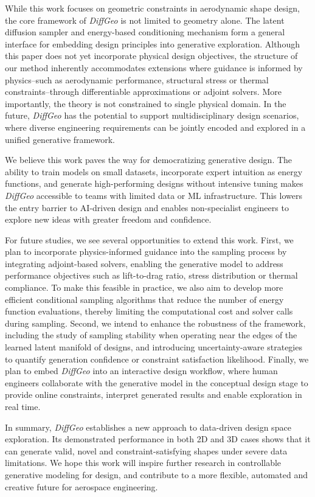 While this work focuses on geometric constraints in aerodynamic shape design, the core framework of \textit{DiffGeo} is not limited to geometry alone. The latent diffusion sampler and energy-based conditioning mechanism form a general interface for embedding design principles into generative exploration. Although this paper does not yet incorporate physical design objectives, the structure of our method inherently accommodates extensions where guidance is informed by physics--such as aerodynamic performance, structural stress or thermal constraints--through differentiable approximations or adjoint solvers. More importantly, the theory is not constrained to single physical domain. In the future, \textit{DiffGeo} has the potential to support multidisciplinary design scenarios, where diverse engineering requirements can be jointly encoded and explored in a unified generative framework.

We believe this work paves the way for democratizing generative design. The ability to train models on small datasets, incorporate expert intuition as energy functions, and generate high-performing designs without intensive tuning makes \textit{DiffGeo} accessible to teams with limited data or ML infrastructure. This lowers the entry barrier to AI-driven design and enables non-specialist engineers to explore new ideas with greater freedom and confidence.

For future studies, we see several opportunities to extend this work. First, we plan to incorporate physics-informed guidance into the sampling process by integrating adjoint-based solvers, enabling the generative model to address performance objectives such as lift-to-drag ratio, stress distribution or thermal compliance. To make this feasible in practice, we also aim to develop more efficient conditional sampling algorithms that reduce the number of energy function evaluations, thereby limiting the computational cost and solver calls during sampling. Second, we intend to enhance the robustness of the framework, including the study of sampling stability when operating near the edges of the learned latent manifold of designs, and introducing uncertainty-aware strategies to quantify generation confidence or constraint satisfaction likelihood. Finally, we plan to embed \textit{DiffGeo} into an interactive design workflow, where human engineers collaborate with the generative model in the conceptual design stage to provide online constraints, interpret generated results and enable exploration in real time.

In summary, \textit{DiffGeo} establishes a new approach to data-driven design space exploration. Its demonstrated performance in both 2D and 3D cases shows that it can generate valid, novel and constraint-satisfying shapes under severe data limitations. We hope this work will inspire further research in controllable generative modeling for design, and contribute to a more flexible, automated and creative future for aerospace engineering.